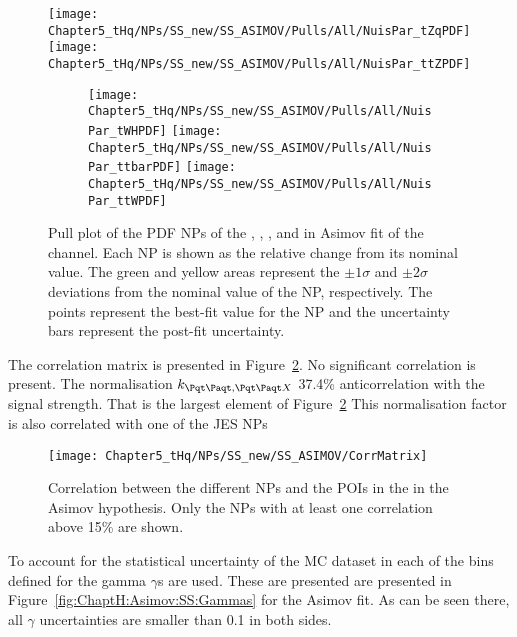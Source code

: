 \begin{figure}[h]
\centering
	\texttt{[image: Chapter5\_tHq/NPs/SS\_new/SS\_ASIMOV/Pulls/All/NuisPar\_tZqPDF]}
  	\texttt{[image: Chapter5\_tHq/NPs/SS\_new/SS\_ASIMOV/Pulls/All/NuisPar\_ttZPDF]}
	\begin{subfigure}{0.3\textwidth}
		\texttt{[image: Chapter5\_tHq/NPs/SS\_new/SS\_ASIMOV/Pulls/All/NuisPar\_tWHPDF]}
		\texttt{[image: Chapter5\_tHq/NPs/SS\_new/SS\_ASIMOV/Pulls/All/NuisPar\_ttbarPDF]}
		\texttt{[image: Chapter5\_tHq/NPs/SS\_new/SS\_ASIMOV/Pulls/All/NuisPar\_ttWPDF]}
	\end{subfigure}
\caption{Pull plot of the PDF NPs of the \tZq, \ttZ, \tWH, \ttW and \ttbar in Asimov fit of the \dilepSStau channel.
   Each NP is shown as the relative change from its nominal value.
   The green and yellow areas represent the $\pm1\sigma$ and $\pm2\sigma$ deviations from the nominal value of the NP, respectively. 
   The points represent the best-fit value for the NP and the uncertainty bars represent the post-fit uncertainty.}
\label{fig:ChaptH:Asimov:SS:TheoryNPs_2}
\end{figure}

\FloatBarrier

The correlation matrix is presented in Figure~\ref{fig:ChaptH:Asimov:SS:Correlation}. 
No significant correlation is present.
The normalisation $k_{\ttbar,  \ttX}$ 37.4\% anticorrelation with the signal strength.
That is the largest element of Figure~\ref{fig:ChaptH:Asimov:SS:Correlation}
This normalisation factor is also correlated with one of the JES NPs



\begin{figure}[h]
\centering
 \texttt{[image: Chapter5\_tHq/NPs/SS\_new/SS\_ASIMOV/CorrMatrix]}
\caption{Correlation between the different NPs and the POIs in the \dilepSStau in the Asimov hypothesis. 
Only the NPs with at least one correlation above 15\% are shown.} 
\label{fig:ChaptH:Asimov:SS:Correlation}
\end{figure}

To account for the statistical uncertainty of the MC dataset in each of the bins defined
for \dilepSStau  the gamma $\gamma$s are used. These are presented are presented 
in Figure~\ref{fig:ChaptH:Asimov:SS:Gammas} for the Asimov fit. As can be seen there,
all $\gamma$ uncertainties are smaller than 0.1 in both sides. 


